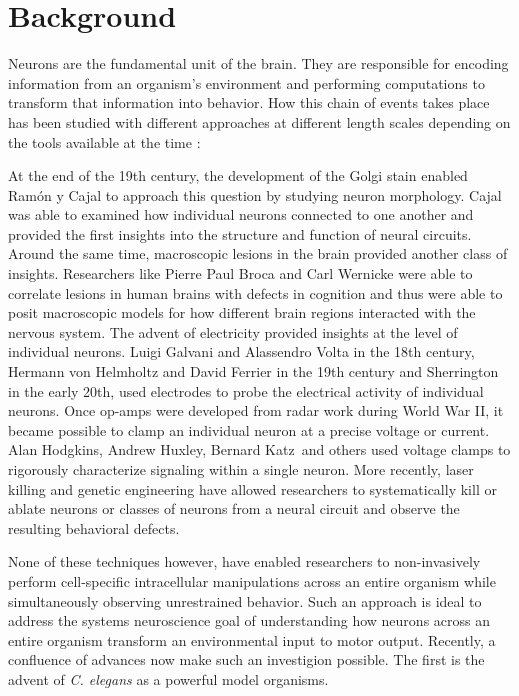 \section{Background}
Neurons are the fundamental unit of the brain.  They are responsible for encoding information from an organism's environment and performing computations to transform that information into  behavior.  How this chain of events takes place has been studied with different approaches at different length scales depending on the tools available at the time \citep{finger_origins_2001, kandel_essentials_1995}: 

At the end of the 19th century, the development of the Golgi stain enabled Ram\'on y Cajal to approach this question by studying neuron morphology.  Cajal was able to examined how individual neurons connected to one another and provided the first insights into the structure and function of neural circuits. Around the same time, macroscopic  lesions in the brain provided another class of insights. Researchers like Pierre Paul Broca and Carl Wernicke were able to correlate lesions in human brains with defects in cognition and thus were able to posit macroscopic models for how different brain regions interacted with the nervous system. The advent of electricity provided insights at the level of individual neurons.  Luigi Galvani and Alassendro Volta in the 18th century, Hermann von Helmholtz and David Ferrier in the 19th century and  Sherrington in the early 20th, used electrodes to probe the electrical activity of individual neurons. Once  op-amps were developed from radar work during  World War II, it became possible to clamp an individual neuron at a precise voltage or current. Alan Hodgkins, Andrew Huxley, Bernard Katz and others used voltage clamps to rigorously characterize signaling within a single neuron. More recently, laser killing and genetic engineering have allowed researchers to systematically kill or ablate  neurons or classes of neurons from a neural circuit and observe the resulting behavioral defects. 

None of these techniques however, have enabled researchers to non-invasively perform cell-specific intracellular manipulations  across an entire organism while simultaneously observing unrestrained behavior.  Such an approach is ideal to address the systems neuroscience goal of understanding how neurons across an entire  organism  transform an environmental input to motor output.  Recently, a confluence of advances now make such an investigion possible. The first is the advent of \textit{C. elegans} as a powerful model organisms.

